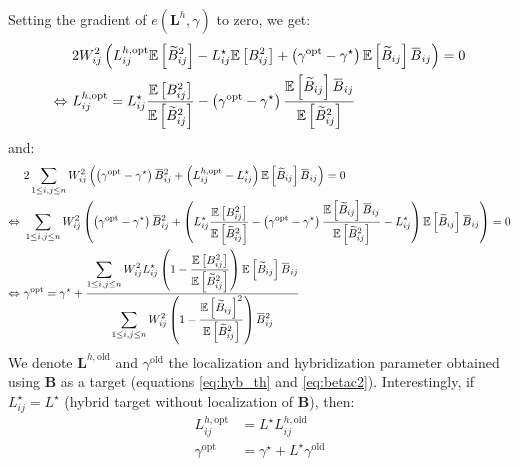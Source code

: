 \documentclass[12pt]{scrartcl}
\newcommand{\overbar}[1]{\mkern 1.5mu\overline{\mkern-1.5mu#1\mkern-1.5mu}\mkern 1.5mu}
\begin{document}
$  $\\
Setting the gradient of $e(\mathbf{L}^h,\gamma)$ to zero, we get:
\begin{align}
& 2 W_{ij}^2 \left(L^{h,\mathrm{opt}}_{ij} \mathbb{E} \left[\widetilde{B}_{ij}^2\right] - L_{ij}^\star \mathbb{E} \left[B^2_{ij}\right] + \left(\gamma^\mathrm{opt} - \gamma^\star \right) \mathbb{E} \left[\widetilde{B}_{ij}\right] \overbar{B}_{ij} \right) = 0 \nonumber \\
\Leftrightarrow \ & L^{h,\mathrm{opt}}_{ij} = L_{ij}^\star \frac{\mathbb{E} \left[B^2_{ij}\right]}{\mathbb{E} \left[\widetilde{B}_{ij}^2\right]} - \left(\gamma^\mathrm{opt} - \gamma^\star \right) \frac{\mathbb{E} \left[\widetilde{B}_{ij}\right] \overbar{B}_{ij}}{\mathbb{E} \left[\widetilde{B}_{ij}^2\right]}
\end{align}
and:
\begin{align}
& 2 \sum_{1 \le i,j \le n} W_{ij}^2 \left(\left(\gamma^\mathrm{opt} - \gamma^\star \right) \overbar{B}_{ij}^2 + \left(L^{h,\mathrm{opt}}_{ij} - L_{ij}^\star\right) \mathbb{E} \left[\widetilde{B}_{ij}\right] \overbar{B}_{ij} \right) = 0 \nonumber \\
\Leftrightarrow \ & \sum_{1 \le i,j \le n} W_{ij}^2 \left(\left(\gamma^\mathrm{opt} - \gamma^\star \right) \overbar{B}_{ij}^2 + \left(L_{ij}^\star \frac{\mathbb{E} \left[B^2_{ij}\right]}{\mathbb{E} \left[\widetilde{B}_{ij}^2\right]} - \left(\gamma^\mathrm{opt} - \gamma^\star \right) \frac{\mathbb{E} \left[\widetilde{B}_{ij}\right] \overbar{B}_{ij}}{\mathbb{E} \left[\widetilde{B}_{ij}^2\right]} - L_{ij}^\star\right) \mathbb{E} \left[\widetilde{B}_{ij}\right] \overbar{B}_{ij} \right) = 0 \nonumber \\
\Leftrightarrow \ & \gamma^\mathrm{opt} = \gamma^\star + \frac{\displaystyle \sum_{1 \le i,j \le n} W_{ij}^2 L_{ij}^\star \left(1 - \frac{\mathbb{E} \left[B^2_{ij}\right]}{\mathbb{E} \left[\widetilde{B}_{ij}^2\right]}\right) \mathbb{E}\left[ \widetilde{B}_{ij}\right] \overbar{B}_{ij}}{\displaystyle \sum_{1 \le i,j \le n} W_{ij}^2 \left(1 - \frac{\mathbb{E} \left[\widetilde{B}_{ij}\right]^2}{\mathbb{E}\left[ \widetilde{B}_{ij}^2 \right]}\right) \overbar{B}_{ij}^2}
\end{align}
We denote $\mathbf{L}^{h,\mathrm{old}}$ and $\gamma^\mathrm{old}$ the localization and hybridization parameter obtained using $\mathbf{B}$ as a target (equations \eqref{eq:hyb_th} and \eqref{eq:betac2}). Interestingly, if $L_{ij}^\star = L^\star$ (hybrid target without localization of $\mathbf{B}$), then:
\begin{subequations}
\begin{align}
L^{h,\mathrm{opt}}_{ij} & = L^\star L^{h,\mathrm{old}}_{ij} \\
\gamma^\mathrm{opt} & = \gamma^\star + L^\star \gamma^\mathrm{old}
\end{align}
\end{subequations}
 
\end{document}
